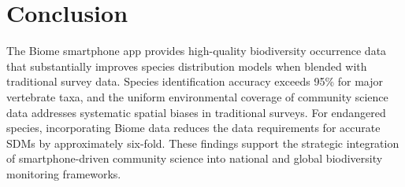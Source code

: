 \documentclass[11pt]{article}
\begin{document}
\section{Conclusion}

The Biome smartphone app provides high-quality biodiversity occurrence data that substantially improves species distribution models when blended with traditional survey data. Species identification accuracy exceeds 95\% for major vertebrate taxa, and the uniform environmental coverage of community science data addresses systematic spatial biases in traditional surveys. For endangered species, incorporating Biome data reduces the data requirements for accurate SDMs by approximately six-fold. These findings support the strategic integration of smartphone-driven community science into national and global biodiversity monitoring frameworks.



\end{document}
